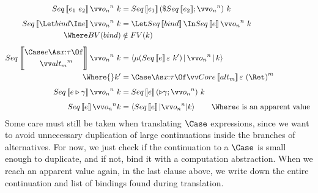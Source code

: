 \documentclass{article}
\begin{document}
\begin{align*}
  Seq\trans{\expr_1 ~ \expr_2} \vect[n]{\frm_n}  ~ \ko
  &=
  Seq\trans{\expr_1} (\appto{Seq\trans{\expr_2}};\vect[n]{\frm_n}) ~ \ko
  \\[1ex]
  Seq\trans{\Let \abind \In \expr} \vect[n]{\frm_n} ~ \ko
  &=
  \Let Seq\trans{\abind} \In Seq\trans{\expr} \vect[n]{\frm_n} ~ \ko
  \\
  \Where
    BV(\abind) &\notin FV(\ko)
  \\[1ex]
  Seq\trans{
  \begin{aligned}
   &\Case \expr \As \ann{x}{\ty} \Of
   \\
   &\qquad
   \vect[m]{\analt_m} 
  \end{aligned}
  }
  \vect[n]{\frm_n} ~ \ko
  &=
  \Braket
    { \comp{\ann{r}{\ty'}} (Seq\trans{\expr} \mt ~ \ko')
    | \vect[n]{\frm_n}
    | \ko }
  \\
  \Where{}
    \ko' &=
       \begin{aligned}[t]
         &
         \Case \As \ann{x}{\ty} \Of
         \vect[m]{Core\trans{\analt_m} \mt ~ (\ret r)}
       \end{aligned}
  \\[1ex]
  Seq\trans{\coerce{\expr}{\cn}} \vect[n]{\frm_n} ~ \ko
  &=
  Seq\trans{\expr} (\castby{\cn} \then \vect[n]{\frm_n}) ~ \ko
  \\[1ex]
  Seq\trans{\expr} \vect[n]{\frm_n} \ko
  &=
  \braket{Seq\trans{\expr} | \vect[n]{\frm_n} | \ko}
  \qquad
  \Where
    \expr \text{ is an apparent value }
\end{align*}
Some care must still be taken when translating $\Case$ expressions, since we want
to avoid unnecessary duplication of large continuations inside the branches of
alternatives.  For now, we just check if the continuation to a $\Case$ is small
enough to duplicate, and if not, bind it with a computation abstraction.  When
we reach an apparent value again, in the last clause above, we write down the
entire continuation and list of bindings found during translation.
\end{document}
